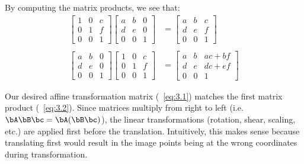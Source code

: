 \begin{Answer}
  By computing the matrix products, we see that:
  \begin{align}
    \begin{bmatrix}
      1 & 0 & c \\
      0 & 1 & f \\
      0 & 0 & 1
    \end{bmatrix}
    \begin{bmatrix}
      a & b & 0 \\
      d & e & 0 \\
      0 & 0 & 1
    \end{bmatrix}
    &= 
    \begin{bmatrix}
      a & b & c \\
      d & e & f \\
      0 & 0 & 1
    \end{bmatrix}~\label{eq:3.2} \\
    \nonumber \\
    \begin{bmatrix}
      a & b & 0 \\
      d & e & 0 \\
      0 & 0 & 1
    \end{bmatrix}
    \begin{bmatrix}
      1 & 0 & c \\
      0 & 1 & f \\
      0 & 0 & 1
    \end{bmatrix}
    &=
    \begin{bmatrix}
      a & b & ac + bf \\
      d & e & dc + ef \\
      0 & 0 & 1
    \end{bmatrix}
  \end{align}

  Our desired affine transformation matrix (~\ref{eq:3.1}) matches the first
  matrix product (~\ref{eq:3.2}).
  Since matrices multiply from right to left
  (i.e. $\bA \bB \bc = \bA (\bB \bc)$),
  the linear transformations (rotation, shear, scaling, etc.)
  are applied first before the translation.
  Intuitively, this makes sense because translating first would
  result in the image points being at the wrong coordinates
  during transformation.
\end{Answer}
